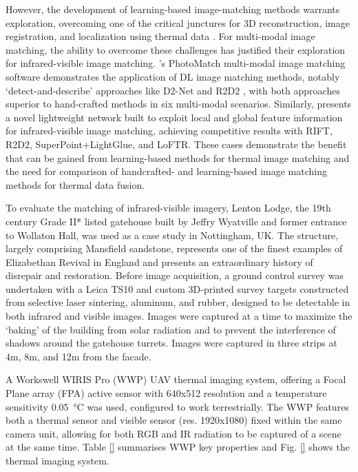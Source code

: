 However, the development of learning-based image-matching methods warrants exploration, overcoming one of the critical junctures for 3D reconstruction, image registration, and localization using thermal data \cite{velesaca_multimodal_2024}. 
For multi-modal image matching, the ability to overcome these challenges has justified their exploration for infrared-visible image matching. 
\citet{RuizDeOna2023_photomatch}’s PhotoMatch multi-modal image matching software demonstrates the application of DL image matching methods, notably ‘detect-and-describe’ approaches like D2-Net \cite{Dusmanu2019_d2net} and R2D2 \cite{revaud2019r2d2}, with both approaches superior to hand-crafted methods in six multi-modal scenarios. 
Similarly, \cite{chang_speed_2024} presents a novel lightweight network built to exploit local and global feature information for infrared-visible image matching, achieving competitive results with RIFT, R2D2, SuperPoint+LightGlue, and LoFTR.
These cases demonstrate the benefit that can be gained from learning-based methods for thermal image matching and the need for comparison of handcrafted- and learning-based image matching methods for thermal data fusion.

To evaluate the matching of infrared-visible imagery, Lenton Lodge, the 19th century Grade II* listed gatehouse built by Jeffry Wyatville and former entrance to Wollaton Hall, was used as a case study in Nottingham, UK. 
The structure, largely comprising Mansfield sandstone, represents one of the finest examples of Elizabethan Revival in England and presents an extraordinary history of disrepair and restoration. 
Before image acquisition, a ground control survey was undertaken with a Leica TS10 and custom 3D-printed survey targets constructed from selective laser sintering, aluminum, and rubber, designed to be detectable in both infrared and visible images. 
Images were captured at a time to maximize the ‘baking’ of the building from solar radiation and to prevent the interference of shadows around the gatehouse turrets.
Images were captured in three strips at 4m, 8m, and 12m from the facade.

A Workswell WIRIS Pro (WWP) UAV thermal imaging system, offering a Focal Plane array (FPA) active sensor with 640x512 resolution and a temperature sensitivity \SI{0.05}{\degreeCelsius} was used, configured to work terrestrially. 
The WWP features both a thermal sensor and visible sensor (res. 1920x1080) fixed within the same camera unit, allowing for both RGB and IR radiation to be captured of a scene at the same time. Table \ref{} summarises WWP key properties and Fig. \ref{} shows the thermal imaging system.


\makechapterbibliography{}
